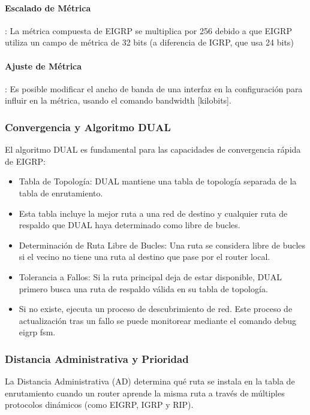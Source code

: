 \documentclass[a5paper]{book}%
\begin{document}
  \paragraph{Escalado de Métrica}: La métrica compuesta de EIGRP se multiplica por 256 debido a que EIGRP utiliza un campo de métrica de 32 bits (a diferencia de IGRP, que usa 24 bits)
  
  \paragraph{Ajuste de Métrica}: Es posible modificar el ancho de banda de una interfaz en la configuración para influir en la métrica, usando el comando bandwidth [kilobits].
  
  
  \subsubsection{Convergencia y Algoritmo DUAL}
  El algoritmo DUAL es fundamental para las capacidades de convergencia rápida de EIGRP:
  
  \begin{itemize}
  	\item Tabla de Topología: DUAL mantiene una tabla de topología separada de la tabla de enrutamiento.
  	\item  Esta tabla incluye la mejor ruta a una red de destino y cualquier ruta de respaldo que DUAL haya determinado como libre de bucles.
  	\item Determinación de Ruta Libre de Bucles: Una ruta se considera libre de bucles si el vecino no tiene una ruta al destino que pase por el router local.
  	\item Tolerancia a Fallos: Si la ruta principal deja de estar disponible, DUAL primero busca una ruta de respaldo válida en su tabla de topología.
  	\item Si no existe, ejecuta un proceso de descubrimiento de red. Este proceso de actualización tras un fallo se puede monitorear mediante el comando debug eigrp fsm.
  \end{itemize} 
  
  
  \subsubsection{Distancia Administrativa y Prioridad}
  La Distancia Administrativa (AD) determina qué ruta se instala en la tabla de enrutamiento cuando un router aprende la misma ruta a través de múltiples protocolos dinámicos (como EIGRP, IGRP y RIP).
  
\end{document}
